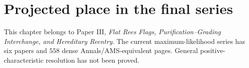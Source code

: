 \documentclass[11pt]{amsart}
\begin{document}
\section{Projected place in the final series}
This chapter belongs to Paper III,
\emph{Flat Rees Flags, Purification--Grading Interchange, and Hereditary
Reentry}.  The current maximum-likelihood series has six papers and $558$
dense Annals/AMS-equivalent pages.  General positive-characteristic resolution
has not been proved.
\end{document}
